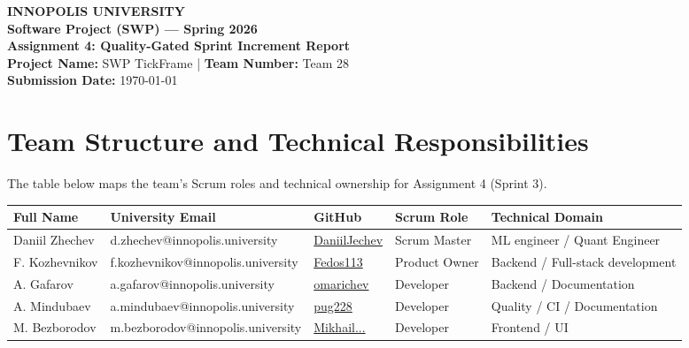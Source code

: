 \documentclass[11pt,a4paper]{article}
\begin{document}
\begin{center}
    {\large \textbf{INNOPOLIS UNIVERSITY}} \\
    \vspace{0.1cm}
    {\large \textbf{Software Project (SWP) --- Spring 2026}} \\
    \vspace{0.5cm}
    \textbf{\Large Assignment 4: Quality-Gated Sprint Increment Report} \\
    \vspace{0.3cm}
    \textbf{Project Name:} SWP TickFrame \quad | \quad \textbf{Team Number:} Team 28 \\
    \textbf{Submission Date:} \today
\end{center}

\vspace{0.5cm}

\section{Team Structure and Technical Responsibilities}

The table below maps the team's Scrum roles and technical ownership for Assignment 4 (Sprint 3).

\vspace{0.2cm}
\begin{table}[h!]
    \centering
    \small
    \begin{tabular}{lllll}
        \toprule
        \textbf{Full Name} & \textbf{University Email} & \textbf{GitHub} & \textbf{Scrum Role} & \textbf{Technical Domain} \\
        \midrule
        Daniil Zhechev & d.zhechev@innopolis.university & \href{https://github.com/DaniilJechev}{DaniilJechev} & Scrum Master & ML engineer / Quant Engineer \\
        F. Kozhevnikov & f.kozhevnikov@innopolis.university & \href{https://github.com/Fedos113}{Fedos113} & Product Owner & Backend / Full-stack development \\
        A. Gafarov & a.gafarov@innopolis.university & \href{https://github.com/omarichev}{omarichev} & Developer & Backend / Documentation \\
        A. Mindubaev & a.mindubaev@innopolis.university & \href{https://github.com/pug228}{pug228} & Developer & Quality / CI / Documentation \\
        M. Bezborodov & m.bezborodov@innopolis.university & \href{https://github.com/MikhailBezborodov024}{Mikhail...} & Developer & Frontend / UI \\
        \bottomrule
    \end{tabular}
\end{table}
\end{document}
